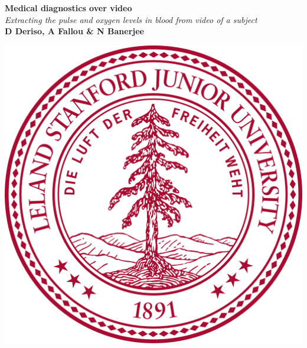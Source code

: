 \documentclass[a0,landscape]{a0poster}
\begin{document}


\begin{minipage}[b]{0.85\linewidth}
\veryHuge \color{NavyBlue} \textbf{Medical diagnostics over video} \color{Black}\\ %
\Huge\textit{Extracting the pulse and oxygen levels in blood from video of a subject}\\[1cm] %
\huge \textbf{D Deriso, A Fallou \& N Banerjee}\\ %
\end{minipage}
%
\begin{minipage}[b]{0.15\linewidth}
\includegraphics[width=15cm]{images/stanfordlogo.png} %
\end{minipage}
\end{document}
